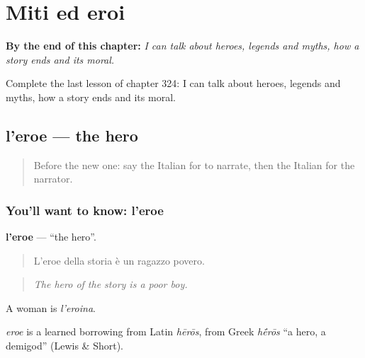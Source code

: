 
\chapter{Miti ed eroi}
\label{ch:it-miti-ed-eroi}

\begin{chapteropening}
\textbf{By the end of this chapter:} \emph{I can talk about heroes, legends and myths, how a story ends and its moral.}

Complete the last lesson of chapter 324: I can talk about heroes, legends and myths, how a story ends and its moral.
\end{chapteropening}

\section[l'eroe]{l'eroe — the hero}

\label{lesson:IT-C324-eroe}



\begin{quote}
Before the new one: say the Italian for to narrate, then the Italian for the narrator.
\end{quote}

\subsection*{You'll want to know: l'eroe}
\textbf{l'eroe} — \textquotedblleft{}the hero\textquotedblright{}.

\begin{quote}
L'eroe della storia è un ragazzo povero.
\end{quote}

\begin{quote}
\emph{The hero of the story is a poor boy.}
\end{quote}

A woman is \emph{l'eroina}.

\begin{cousinweb}
\emph{eroe} is a learned borrowing from Latin \emph{hērōs}, from Greek \emph{h\'{\={e}}rōs} \textquotedblleft{}a hero, a demigod\textquotedblright{} (Lewis \& Short).
\end{cousinweb}

